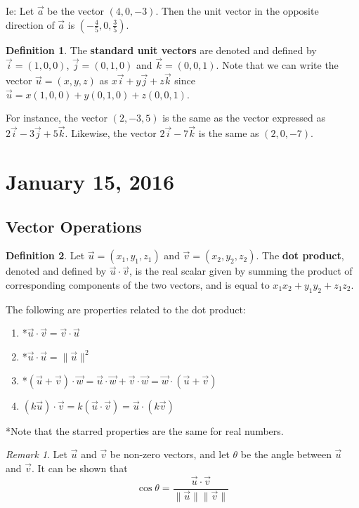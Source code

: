 \documentclass[11pt]{article}
\theoremstyle{plain} %
\theoremstyle{definition}
\newtheorem*{definition}{Definition} %
\theoremstyle{example}
\theoremstyle{remark}
\newtheorem*{remark}{Remark}
\begin{document}
Ie: Let $\vec{a}$ be the vector $(4, 0, -3)$. Then the unit vector in the opposite direction of $\vec{a}$ is $(-\frac{4}{5}, 0, \frac{3}{5})$. 

\begin{definition}
The \textbf{standard unit vectors} are denoted and defined by $\vec{i} = (1, 0, 0)$, $\vec{j} = (0,1, 0)$ and $\vec{k} = (0,0,1)$. Note that we can write the vector $\vec{u} = (x, y, z)$ as $x\vec{i} + y\vec{j} + z\vec{k} $ since $\vec{u} = x(1, 0, 0) + y(0,1,0)+z(0,0,1)$.
\end{definition}

For instance, the vector $(2, -3, 5)$ is the same as the vector expressed as $2\vec{i} -3\vec{j} +5 \vec{k}$. Likewise, the vector $2\vec{i} -7\vec{k}$ is the same as $(2, 0, -7)$.

\section{January 15, 2016}
\subsection{Vector Operations}

\begin{definition}
Let $\vec{u} = (x_1, y_1, z_1)$ and $\vec{v} = (x_2, y_2, z_2)$. The \textbf{dot product}, denoted and defined by $\vec{u} \cdot \vec{v}$, is the real scalar given by summing the product of corresponding components of the two vectors, and is equal to $x_1x_2 + y_1y_2 + z_1z_2$.
\end{definition}

The following are properties related to the dot product:

\begin{enumerate}
	\item *$\vec{u} \cdot \vec{v} = \vec{v} \cdot \vec{u}$
	\item *$\vec{u} \cdot \vec{u} = \|\vec{u}\|^2$
	\item *$\left(\vec{u}+\vec{v} \right) \cdot \vec{w} = \vec{u} \cdot \vec{w} +\vec{v} \cdot \vec{w} = \vec{w} \cdot \left(\vec{u}+\vec{v} \right) $
	\item $(k\vec{u}) \cdot \vec{v} = k(\vec{u} \cdot \vec{v}) = \vec{u} \cdot (k\vec{v})$

\end{enumerate}

*Note that the starred properties are the same for real numbers. 


\begin{remark}
Let $\vec{u}$ and $\vec{v}$ be non-zero vectors, and let $\theta$ be the angle between $\vec{u}$ and $\vec{v}$. It can be shown that $$\cos\theta = \frac{\vec{u}\cdot\vec{v}}{\|\vec{u}\|\|\vec{v}\|}$$  
\end{remark}
\end{document}
